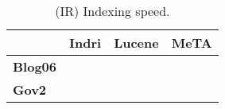 \begin{table}[t]
\centering
{\small
\begin{tabular}{|l|r|r|r|}
        \hline & \textbf{Indri} & \textbf{Lucene} & \textbf{MeTA} \\
        \hline
        \textbf{Blog06} & & & \\
        \textbf{Gov2}    & & & \\
        \hline
\end{tabular}
\caption{(IR) Indexing speed.}
\label{table:ir-indexing}
}
\end{table}
